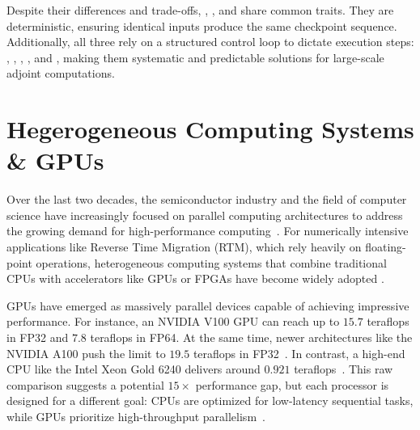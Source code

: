 \documentclass[Ingles]{ic-tese-v3}
\begin{document}
Despite their differences and trade-offs, \revolve, \zcut, and \uniform share common traits. They are deterministic, ensuring identical inputs produce the same checkpoint sequence. Additionally, all three rely on a structured control loop to dictate execution steps: \fwd, \save, \restore, \bwd, and \terminate, making them systematic and predictable solutions for large-scale adjoint computations. 




\section{Hegerogeneous Computing Systems \& GPUs} %
\label{sec:gpus}

Over the last two decades, the semiconductor industry and the field of computer science have increasingly focused on parallel computing architectures to address the growing demand for high-performance computing~\cite{hennessy}. For numerically intensive applications like Reverse Time Migration (RTM), which rely heavily on floating-point operations, heterogeneous computing systems that combine traditional CPUs with accelerators like GPUs or FPGAs have become widely adopted \cite{dussand2008,liu2012,rigon2024}.

GPUs have emerged as massively parallel devices capable of achieving impressive performance. For instance, an NVIDIA V100 GPU can reach up to $15.7$ teraflops in FP32 and $7.8$ teraflops in FP64\cite{v100}. At the same time, newer architectures like the NVIDIA A100 push the limit to $19.5$ teraflops in FP32~\cite{a100}. In contrast, a high-end CPU like the Intel Xeon Gold 6240 delivers around $0.921$ teraflops~\cite{xeon}. This raw comparison suggests a potential $15\times$ performance gap, but each processor is designed for a different goal: CPUs are optimized for low-latency sequential tasks, while GPUs prioritize high-throughput parallelism~\cite{kirk}.
\end{document}

